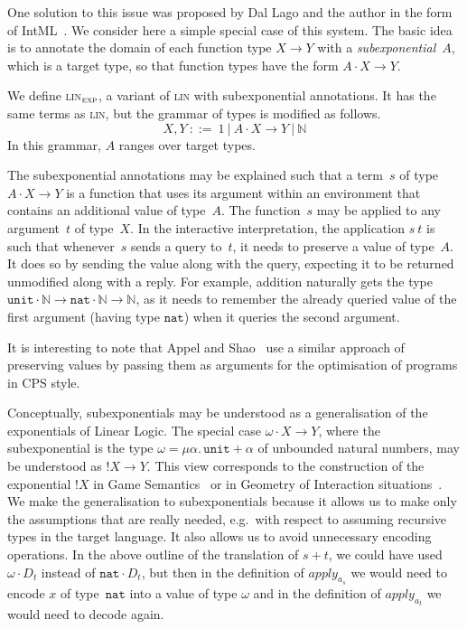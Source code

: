 \documentclass{LMCS}
\theoremstyle{definition}
\theoremstyle{plain}
\newcommand{\lolli}[3]{#1\cdot #2 \to #3}
\newcommand{\NN}{\mathbb{N}}
\newcommand{\unit}{\mathtt{unit}}
\newcommand{\VN}{\mathtt{nat}}
\newcommand{\Capply}{\textit{apply}}
\newcommand{\Mid}{\ \mathrel{\big|} \ }
\newcommand{\linexp}{\textsc{lin}$_\textsc{exp}$\xspace}
\begin{document}
One solution to this issue was proposed by Dal Lago and the author
in the form of IntML~\cite{intml}. We consider here a simple special case of this system. 
The basic idea is to annotate the domain of each function type $X\to Y$ 
with a \emph{subexponential}~$A$, which is a target type,
so that function types have the form $\lolli A X Y$.

We define \linexp, a variant of \textsc{lin} with subexponential
annotations. It has the same terms as \textsc{lin}, but the
grammar of types is modified as follows.
\[
  X, Y \ ::=\  1  \Mid \lolli A X Y \Mid \NN  
\]
In this grammar, $A$ ranges over target types.

The subexponential annotations may be explained such that a term~$s$ 
of type $\lolli A X Y$ 
is a function that uses its argument within an environment that
contains an additional value of type~$A$.
The function~$s$ may be applied to any argument~$t$ of type~$X$.
In the interactive interpretation, the application $s\ t$ is such that  
whenever~$s$ sends a query to~$t$, it needs to preserve a value of
type~$A$. It does so by sending the value along with the
query, expecting it to be returned unmodified along with a reply.
For example, addition naturally gets the type  
$\lolli \unit \NN {\lolli \VN \NN \NN}$, as it needs to remember the
already queried value  of the first argument (having type $\VN$) when it queries the
second argument.

It is interesting to note that 
Appel and Shao~\cite[\S 3.2]{DBLP:journals/toplas/ShaoA00} use a 
similar approach of preserving values by passing them as arguments 
for the optimisation of programs in CPS style.

Conceptually, subexponentials may be understood as a generalisation of the 
exponentials of Linear Logic. 
The special case $\lolli \omega X Y$, where the subexponential is the type
$\omega = \mu \alpha.\,\unit + \alpha$ of unbounded natural numbers, 
may be understood as ${!}X\to Y$.
This view corresponds to the construction of the exponential ${!}X$ in 
Game Semantics~\cite{AbramskyJM00} or in 
Geometry of Interaction situations~\cite{DBLP:journals/mscs/AbramskyHS02}.
We make the generalisation to subexponentials because it allows us to make only the assumptions
that are really needed, e.g.~with respect to assuming recursive types in 
the target language. It also allows us to avoid unnecessary encoding operations.
In the above outline of the translation of $s+t$, we could have used 
$\omega \cdot D_t$ instead of $\VN \cdot D_t$, but then
in the definition of $\Capply_{a_s}$ we would need to encode $x$ of
type~$\VN$ into a value of type $\omega$ and in the definition of
$\Capply_{a_t}$ we would need to decode again. 
\end{document}
